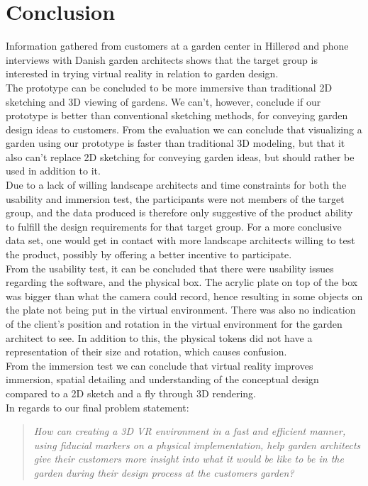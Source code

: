 \chapter{Conclusion}
Information gathered from customers at a garden center in Hillerød and phone interviews with Danish garden architects shows that the target group is interested in trying virtual reality in relation to garden design.\\

The prototype can be concluded to be more immersive than traditional 2D sketching and 3D viewing of gardens. We can't, however, conclude if our prototype is better than conventional sketching methods, for conveying garden design ideas to customers. From the evaluation we can conclude that visualizing a garden using our prototype is faster than traditional 3D modeling, but that it also can't replace 2D sketching for conveying garden ideas, but should rather be used in addition to it.\\

Due to a lack of willing landscape architects and time constraints for both the usability and immersion test, the participants were not members of the target group, and the data produced is therefore only suggestive of the product ability to fulfill the design requirements for that target group. For a more conclusive data set, one would get in contact with more landscape architects willing to test the product, possibly by offering a better incentive to participate.\\

From the usability test, it can be concluded that there were usability issues regarding the software, and the physical box. The acrylic plate on top of the box was bigger than what the camera could record, hence resulting in some objects on the plate not being put in the virtual environment. There was also no indication of the client's position and rotation in the virtual environment for the garden architect to see. In addition to this, the physical tokens did not have a representation of their size and rotation, which causes confusion.\\

From the immersion test we can conclude that virtual reality improves immersion, spatial detailing and understanding of the conceptual design compared to a 2D sketch and a fly through 3D rendering.\\
In regards to our final problem statement:\\
\begin{quote}
	\textit{How can creating a 3D VR environment in a fast and efficient manner, using fiducial markers on a physical implementation, help garden architects give their customers more insight into what it would be like to be in the garden during their design process at the customers garden?}\\
\end{quote}

